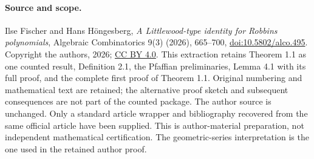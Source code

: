 \paragraph{Source and scope.} Ilse Fischer and Hans H\"ongesberg, \emph{A Littlewood-type identity for Robbins polynomials}, Algebraic Combinatorics 9(3) (2026), 665--700, \href{https://doi.org/10.5802/alco.495}{doi:10.5802/alco.495}. Copyright the authors, 2026; \href{https://creativecommons.org/licenses/by/4.0/}{CC BY 4.0}.
This extraction retains Theorem 1.1 as one counted result, Definition 2.1, the Pfaffian preliminaries, Lemma 4.1 with its full proof, and the complete first proof of Theorem 1.1. Original numbering and mathematical text are retained; the alternative proof sketch and subsequent consequences are not part of the counted package.
The author source is unchanged. Only a standard article wrapper and bibliography recovered from the same official article have been supplied. This is author-material preparation, not independent mathematical certification. The geometric-series interpretation is the one used in the retained author proof.
